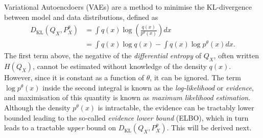 Variational Autoencdoers (VAEs) \citep{kingma2013auto, rezende2014stochastic} are a method to minimise the KL-divergence between model and data distributions, defined as
%
\begin{align*}
D_{\text{KL}}(Q_X, P^\theta_X) &= \int q(x) \log \left( \frac{q(x)}{p^\theta(x)} \right) dx \\
&= \int q(x) \log q(x) - \int q(x) \log p^\theta(x) dx.
\end{align*}
%
The first term above, the negative of the \emph{differential entropy} of $Q_X$, often written $H(Q_X)$, cannot be estimated without knowledge of the density $q(x)$.
However, since it is constant as a function of $\theta$, it can be ignored.
The term $\log p^\theta(x)$ inside the second integral is known as the \emph{log-likelihood} or \emph{evidence}, and maximisation of this quantity is known as \emph{maximum likelihood estimation}. 
Although the density $p^\theta(x)$ is intractable, the evidence can be tractably lower bounded leading to the so-called \emph{evidence lower bound} (ELBO), which in turn leads to a tractable \emph{upper} bound on $D_{\text{KL}}(Q_X, P^\theta_X)$. 
This will be derived next.


